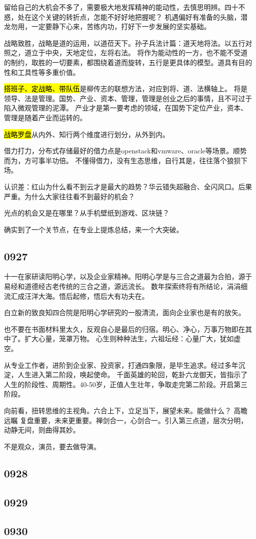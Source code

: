 留给自己的大机会不多了，需要极大地发挥精神的能动性，去慎思明辨。四十不惑，处在这个关键的转折点，怎能不好好地把握呢？
机遇偏好有准备的头脑，潜龙勿用，一定要静下心来，苦练内功，打好下一步发展的坚实基础。

战略致胜，战略是道的运用，以道莅天下。孙子兵法计篇：道天地将法。以五行对照之，道立于中央，天地定位，左将右法。
将作为能动性的一方，也不能不受道的制约，取胜的一切要素，都围绕着道而旋转，五行是更具体的模型。道具有目的性和工具性等多重价值。

\hl{搭班子、定战略、带队伍}是柳传志的联想方法，对应到将、道、法横轴上。
将是领导、法是管理。国势、产业、资本、管理，管理是创业之后的事情，且不可过于陷入微观管理的泥潭。
产业才是第一要考虑的领域，在国势下定位产业，资本、管理是随着产业而运转的。

\hl{战略罗盘}从内外、知行两个维度进行划分，从外到内。

借力打力，分布式存储最好的借力点是openstack和vmware、oracle等场景。顺势而为，方可事半功倍。
不懂得借力，没有生态思维，自行其是，往往落个狼狈下场。

认识差：红山为什么看不到云才是最大的趋势？华云错失超融合、全闪风口。后果严重。为什么大家往往看不到最好的机会？

光点的机会又是在哪里？从手机壁纸到游戏、区块链？

确实到了一个关节点，在专业上提炼总结，来一个大突破。

\subsection{0927}

十一在家研读阳明心学，以及企业家精神。阳明心学是与三合之道最为合拍，源于易经和道德经古老传统的三合之道，源远流长。
数年探索终将有所结论，涓涓细流汇成汪洋大海。悟后起修，悟后大有功夫在。

白立新的致良知四合院是阳明心学研究的一股清流，面向企业家也是有的放矢。

也不要在书面材料里太久，反观自心是最后的归宿。明心、净心，万事万物即在其中了。扩大心量，笼罩万物。
心生则种种法生，六祖坛经：心量广大，犹如虚空。

从专业工作者，进阶到企业家、投资家，打通四象限，是毕生追求。经过多年沉淀，人生进入第二阶段，唤起使命。
千面英雄的轮回，乾卦六龙御天，皆指示了人生的阶段性、周期性。40-50岁，正值人生壮年，争取走完第二阶段。开启第三阶段。

向前看，扭转思维的主视角。六合上下，立足当下，展望未来。能做什么？ 高瞻远瞩
复盘重要，未来更重要。禅剑合一，心剑合一。引入第三点道，层次分明，动静无间，则曲得其妙。

不是观众，演员，要去做导演。

\subsection{0928}

\subsection{0929}

\subsection{0930}
